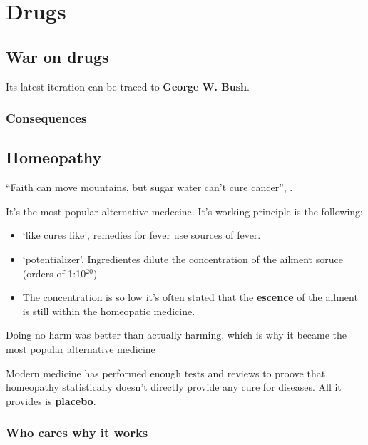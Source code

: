
\section{Drugs} 

	\subsection{War on drugs} 

	Its latest iteration can be traced to \textbf{George W. Bush}.


	\subsubsection{Consequences}


\subsection{Homeopathy}  

	``Faith can move mountains, but sugar water can't cure cancer'', \citet{homeopathy_kurzgesagt}.

	It's the most popular alternative medecine. It's working principle is the following:
	\begin{itemize}
		\item `like cures like', remedies for fever use sources of fever.
		\item `potentializer'. Ingredientes dilute the concentration of the ailment soruce (orders of 1:10$^{20}$)
		\item The concentration is so low it's often stated that the \textbf{escence} of the ailment is still within the homeopatic medicine.
	\end{itemize}


	Doing no harm was better than actually harming, which is why it became the most popular alternative medicine

	Modern medicine has performed enough tests and reviews to proove that homeopathy statistically doesn't directly provide any cure for diseases. All it provides is \textbf{placebo}.

	\subsubsection{Who cares why it works} 

